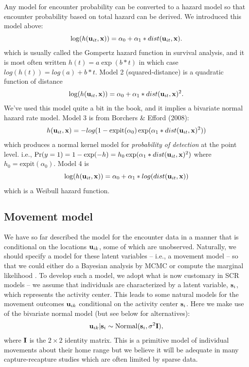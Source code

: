 Any model for encounter probability can be converted to a hazard model
so that encounter probability based on total hazard can be derived.
We introduced this model above:
\[
\log(h({\bf u}_{it},{\bf x})) = \alpha_{0} + \alpha_{1}*dist({\bf u}_{it},{\bf x}).
\]
which is usually called the Gompertz hazard function in survival
analysis, and it is most often written $h(t) = a \exp( b*t)$ in which
case $log(h(t)) = log(a) + b*t$.  Model 2 (squared-distance) is a
quadratic function of distance
\[
\log(h({\bf u}_{it},{\bf x})) = \alpha_{0} + \alpha_{1}*dist({\bf u}_{it},{\bf x})^2.
\]
We've used this model quite a bit in the book, and it implies a
bivariate normal hazard rate model. Model 3 is from Borchers \& Efford
(2008):
\[
h({\bf u}_{it},{\bf x} ) = -log(1 - \mbox{expit}(\alpha_{0})
\exp( \alpha_{1}*dist({\bf u}_{it},{\bf x})^2 ) )
\]
which produces a normal kernel model for {\it probability of
  detection} at the point level. i.e., $\Pr(y=1) = 1-\exp(-h) = h_{0}
\exp( \alpha_{1}*dist({\bf u}_{it},{\bf x})^2 )$ where $h_{0} =
\mbox{expit}(\alpha_{0})$.  Model 4 is
\[
\log(h({\bf u}_{it},{\bf x})) = \alpha_{0} + \alpha_{1}*log(dist({\bf u}_{it},{\bf x}))
\]
which is a Weibull hazard function.



\subsection{Movement model}

We have so far described the model for the encounter data in a manner
that is conditional on the locations ${\bf u}_{ik}$, some of which are
unobserved. Naturally, we should specify a model for these latent
variables -- i.e., a movement model -- so that we could either do a Bayesian analysis by MCMC
\citep{royle_young:2008, royle_etal:2011} or compute the marginal likelihood
\citep{efford:2011}.
To develop such a model, we adopt
what is now customary in SCR models -- we
assume that individuals are characterized by a latent variable, ${\bf
  s}_{i}$, which represents the activity center.
This leads to some natural models
 for the movement outcomes
${\bf u}_{ik}$ conditional on the activity center
${\bf  s}_{i}$. Here we make use of the bivariate normal model (but
see below for alternatives):
\[
 {\bf u}_{ik} | {\bf s}_{i} \sim \mbox{Normal}({\bf s}_{i}, \sigma^{2}{\bf I}),
\]
where ${\bf I}$ is the $2\times 2$ identity matrix.  This is a
primitive model of individual movements about their home range but we
believe it will be adequate in many capture-recapture studies which
are often limited by sparse data.

